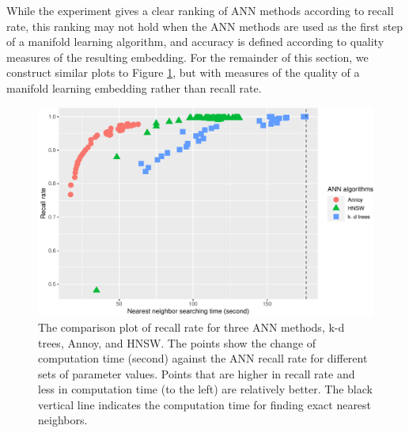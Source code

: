 \documentclass[12pt]{article}
\begin{document}
While the experiment gives a clear ranking of ANN methods according to recall rate, this ranking may not hold when the ANN methods are used as the first step of a manifold learning algorithm, and accuracy is defined according to quality measures of the resulting embedding. For the remainder of this section, we construct similar plots to Figure \ref{fig:recall}, but with measures of the quality of a manifold learning embedding rather than recall rate.

\begin{figure}

{\centering \includegraphics[width=0.8\linewidth]{mlann_jcgs_files/figure-latex/recall-1} 

}

\caption{The comparison plot of recall rate for three ANN methods, k-d trees, Annoy, and HNSW. The points show the change of computation time (second) against the ANN recall rate for different sets of parameter values. Points that are higher in recall rate and less in computation time (to the left) are relatively better. The black vertical line indicates the computation time for finding exact nearest neighbors. }\label{fig:recall}
\end{figure}
\end{document}
